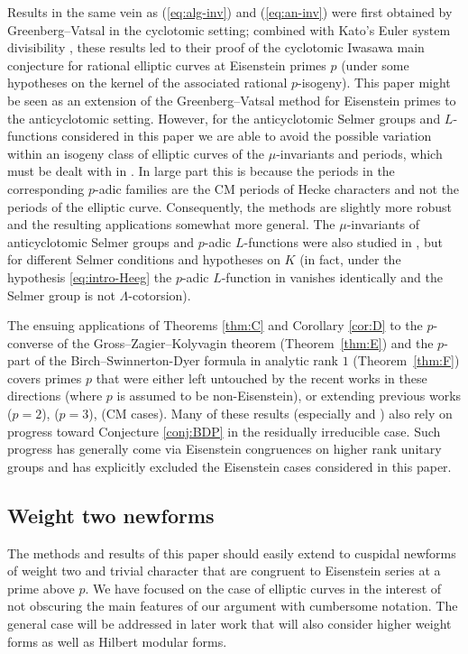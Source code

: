 Results in the same vein as (\ref{eq:alg-inv}) and (\ref{eq:an-inv}) were first obtained by Greenberg--Vatsal \cite{greenvats} in the cyclotomic setting; combined with Kato's Euler system divisibility \cite{kato-euler-systems}, these results led to their proof of the cyclotomic Iwasawa main conjecture for rational elliptic curves at Eisenstein primes $p$ (under some hypotheses on the kernel of the associated rational $p$-isogeny). This paper might be seen as an extension of the Greenberg--Vatsal method for Eisenstein primes to the anticyclotomic setting.
{However, for the anticyclotomic Selmer groups and $L$-functions considered in this paper we are able to avoid the possible variation within an isogeny class of elliptic curves of the $\mu$-invariants and periods, which must be dealt with in \cite{greenvats}. In large part this is because the periods
in the corresponding $p$-adic families are the CM periods of Hecke characters and not the periods of the elliptic curve.  Consequently, the methods are slightly more robust and the resulting applications somewhat more general.
The $\mu$-invariants of anticyclotomic Selmer groups and $p$-adic $L$-functions were also studied in \cite{pollack2011anticyclotomic}, but for different Selmer conditions and hypotheses on $K$ (in fact, under the hypothesis \eqref{eq:intro-Heeg} the $p$-adic $L$-function in \cite{pollack2011anticyclotomic} vanishes identically and the Selmer group is not $\Lambda$-cotorsion).}


The ensuing applications {of Theorems \ref{thm:C} and Corollary \ref{cor:D}} to the $p$-converse of the Gross--Zagier--Kolyvagin theorem (Theorem~\ref{thm:E}) and the $p$-part of the Birch--Swinnerton-Dyer formula in analytic rank $1$ (Theorem~\ref{thm:F}) covers primes $p$ that were either left untouched by the recent works in these directions \cite{pCONVskinner,pCONVvenerucci,pBSDbert,wei-zhang,skinner-zhang,jsw,castella,pBSDbps} (where $p$ is assumed to be non-Eisenstein), or extending previous works \cite{tian,CLTZ,CCL} ($p=2$),  \cite{kriz-li} ($p=3$), \cite{CMpconverse} (CM cases). {Many of these results (especially \cite{pCONVskinner} and \cite{jsw}) also rely on progress toward
 Conjecture \ref{conj:BDP} in the residually irreducible case. Such progress has generally come via Eisenstein congruences on higher rank unitary groups and has explicitly excluded the Eisenstein cases considered in this paper.}


\subsection{Weight two newforms} The methods and results of this paper should easily extend to cuspidal newforms of weight two and trivial character that are congruent to Eisenstein series at a prime above $p$. We have focused on the case of elliptic curves in the interest of not obscuring the main features of our argument with cumbersome notation. The general case will be addressed in later work that will also consider higher weight forms as well as Hilbert modular forms.

